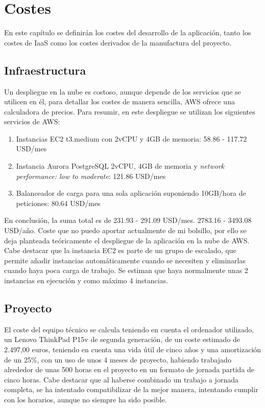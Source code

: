 \chapter{Costes}
En este capítulo se definirán los costes del desarrollo de la aplicación, tanto los costes de IaaS como los costes derivados de la manufactura del proyecto.

\section{Infraestructura}
Un despliegue en la nube es costoso, aunque depende de los servicios que se utilicen en él, para detallar los costes de manera sencilla, \gls{AWS} ofrece una calculadora de precios. Para resumir, en este despliegue se utilizan los siguientes servicios de \gls{AWS}:
\begin{enumerate}
    \item Instancias \gls{EC2} t3.medium con 2vCPU y 4GB de memoria: 58.86 - 117.72 USD/mes
    \item Instancia Aurora PostgreSQL 2vCPU, 4GB de memoria y \emph{network performance: low to moderate}: 121.86 USD/mes
    \item Balanceador de carga para una sola aplicación suponiendo 10GB/hora de peticiones: 80.64 USD/mes
\end{enumerate}

En conclusión, la suma total es de 231.93 - 291.09 USD/mes. 2783.16 - 3493.08 USD/año. Coste que no puedo aportar actualmente de mi bolsillo, por ello se deja planteada teóricamente el despliegue de la aplicación en la nube de \gls{AWS}. Cabe destacar que la instancia EC2 es parte de un grupo de escalado, que permite añadir instancias automáticamente cuando se necesiten y eliminarlas cuando haya poca carga de trabajo. Se estiman que haya normalmente unas 2 instancias en ejecución y como máximo 4 instancias.

\section{Proyecto}
El coste del equipo técnico se calcula teniendo en cuenta el ordenador utilizado, un Lenovo ThinkPad P15v de segunda generación, de un coste estimado de 2.497,00 euros, teniendo en cuenta una vida útil de cinco años y una amortización de un 25\%, con un uso de unos 4 meses de proyecto, habiendo trabajado alrededor de unas 500 horas en el proyecto en un formato de jornada partida de cinco horas. Cabe destacar que al haberse combinado un trabajo a jornada completa, se ha intentado compatibilizar de la mejor manera, intentando cumplir con los horarios, aunque no siempre ha sido posible.

